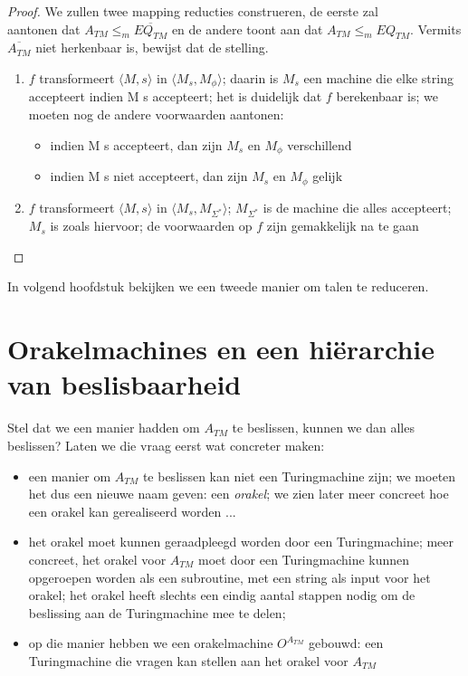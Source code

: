 \begin{proof}
We zullen twee mapping reducties construeren, de eerste zal \\ aantonen
dat $A_{TM} \leq_m \overline{EQ_{TM}}$  en de andere toont aan dat
$A_{TM} \leq_m EQ_{TM}$. Vermits $\overline{A_{TM}}$ niet herkenbaar is, bewijst
dat de stelling.
\begin{enumerate}
\item $f$ transformeert $\langle M,s \rangle$ in $\langle M_s,M_\phi \rangle$; daarin is $M_s$ een
machine die elke string accepteert indien M s accepteert; het is
duidelijk dat $f$ berekenbaar is; we moeten nog de andere voorwaarden
aantonen:
\begin{itemize}
\item indien M s accepteert, dan zijn $M_s$ en $M_\phi$ verschillend
\item indien M s niet accepteert, dan zijn $M_s$ en $M_\phi$ gelijk
\end{itemize}

\item $f$ transformeert $\langle M,s \rangle$ in $\langle M_s,M_{\Sigma^*} \rangle$; $M_{\Sigma^*}$
is de machine die alles accepteert; $M_s$ is zoals hiervoor; de
voorwaarden op $f$ zijn gemakkelijk na te gaan
\end{enumerate}
\end{proof}

In volgend hoofdstuk bekijken we een tweede manier om talen te reduceren.





\section{Orakelmachines en een hi\"erarchie van beslisbaarheid}

Stel dat we een manier hadden om $A_{TM}$ te beslissen, kunnen we dan
alles beslissen? Laten we die vraag eerst wat concreter maken:
\begin{itemize}
\item een manier om $A_{TM}$ te beslissen kan niet een Turingmachine
zijn; we moeten het dus een nieuwe naam geven: een {\em orakel}; we
zien later meer concreet hoe een orakel kan gerealiseerd worden ...

\item het orakel moet kunnen geraadpleegd worden door een
Turingmachine; meer concreet, het orakel voor $A_{TM}$ moet door een
Turingmachine kunnen opgeroepen worden als een subroutine, met een
string als input voor het orakel; het orakel heeft slechts een eindig
aantal stappen nodig om de beslissing aan de Turingmachine mee te
delen;

\item op die manier hebben we een orakelmachine $O^{A_{TM}}$ gebouwd:
een Turingmachine die vragen kan stellen aan het orakel voor $A_{TM}$
\end{itemize}

